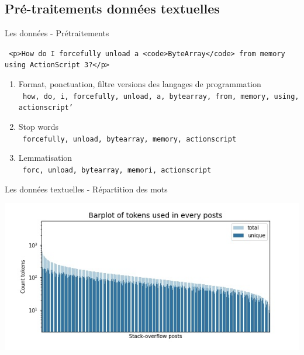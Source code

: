 \documentclass[10pt]{beamer}
\begin{document}
\subsection{Pré-traitements données textuelles}
\begin{frame}{Les données - Prétraitements}
    
    {\small \centering \centering
        \texttt{%
        <p>How do I forcefully unload a <code>ByteArray</code> from memory using ActionScript 3?</p>}
    }
    \begin{enumerate}
        \item Format, ponctuation, filtre versions des langages de programmation\\
            {\small \centering
            \texttt{%
            how, do, i, forcefully, unload, a, bytearray, from, memory, using, actionscript'}
            }
        \item Stop words\\
            {\small \centering
            \texttt{%
            forcefully, unload, bytearray, memory, actionscript}
            }
        \item Lemmatisation\\
            {\small \centering
            \texttt{%
            forc, unload, bytearray, memori, actionscript}
            }
    \end{enumerate}
\end{frame}
\begin{frame}{Les données textuelles - Répartition des mots}
   \begin{center}
       \includegraphics[width=\linewidth]{figures/barplot_tokens1.jpg}
   \end{center}
\end{frame}
\end{document}
